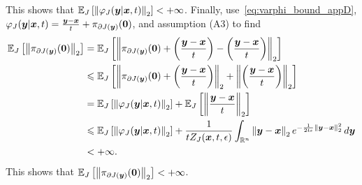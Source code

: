 \eeq
This shows that $\expectationJ{\normtwo{\varphi_J(\by|\bx,t)}} < + \infty$. Finally, use~\eqref{eq:varphi_bound_appD}, $\varphi_J(\by|\bx,t) = \frac{\by-\bx}{t} + \pi_{\partial J(\by)}(\boldsymbol{0})$, and assumption (A3) to find
\[
\begin{alignedat}{1}
\expectationJ{\normtwo{\pi_{\partial J(\by)}(\boldsymbol{0})}} &= \expectationJ{\normtwo{\pi_{\partial J(\by)}(\boldsymbol{0}) + \left(\frac{\by-\bx}{t}\right) - \left(\frac{\by-\bx}{t}\right)}} \\
&\leqslant \expectationJ{\normtwo{\pi_{\partial J(\by)}(\boldsymbol{0}) + \left(\frac{\by-\bx}{t}\right)} + \normtwo{\left(\frac{\by-\bx}{t}\right)}} \\
&=\expectationJ{\normtwo{\varphi_J(\by|\bx,t)}} + \expectationJ{\normtwo{\frac{\by-\bx}{t}}} \\
& \leqslant \expectationJ{\normtwo{\varphi_J(\by|\bx,t)}} + \frac{1}{tZ_J(\bx,t,\epsilon)}\int_{\Rn} \normtwo{\by-\bx} e^{-\frac{1}{2t\epsilon}\normsq{\by-\bx}} \diff\by \\
& < +\infty.
\end{alignedat}
\]
This shows that $\expectationJ{\normtwo{\pi_{\partial J(\by)}(\boldsymbol{0})}} < +\infty$.